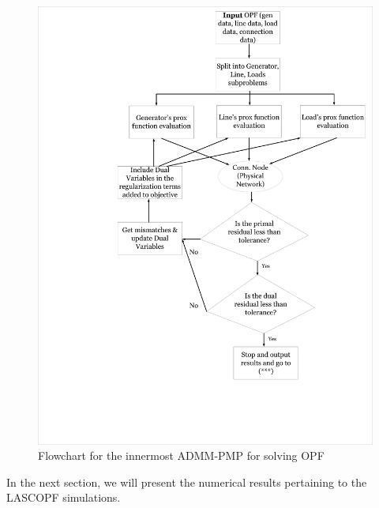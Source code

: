\documentclass[preprint,12pt,3p]{elsarticle}
\begin{document}
\begin{figure}
\begin{center}
\vspace*{-2cm}
\hspace*{-4cm}
\includegraphics[width=0.92\linewidth,trim=5mm 12mm 5mm 5mm, clip]{OPFADMM.pdf}
\caption{Flowchart for the innermost ADMM-PMP for solving OPF}
\label{OPFADMM}
\end{center}
\end{figure}
In the next section, we will present the numerical results pertaining to the LASCOPF simulations.
%
%
\end{document}
